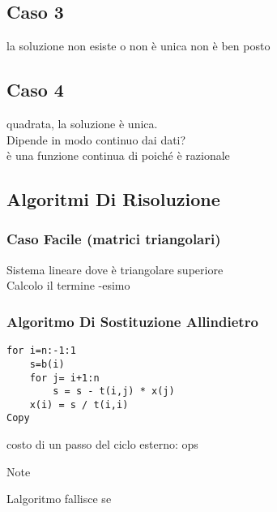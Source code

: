 \documentclass[
]{article}
\begin{document}
\hypertarget{caso-3}{%
\subsection{Caso 3}\label{caso-3}}

{} la soluzione non esiste o non è unica {} non è ben posto

\hypertarget{caso-4}{%
\subsection{Caso 4}\label{caso-4}}

{} quadrata, {} la soluzione è unica.\\
Dipende in modo continuo dai dati?\\
{}{}è una funzione continua di {} poiché è razionale

\hypertarget{algoritmi-di-risoluzione}{%
\subsection{Algoritmi Di Risoluzione}\label{algoritmi-di-risoluzione}}

\hypertarget{caso-facile-matrici-triangolari}{%
\subsubsection{Caso Facile (matrici
triangolari)}\label{caso-facile-matrici-triangolari}}

{}{}Sistema lineare {} dove {} è triangolare superiore\\
{}Calcolo il termine {}-esimo\\
{}{}{}{}

\hypertarget{algoritmo-di-sostituzione-allindietro}{%
\subsubsection{Algoritmo Di Sostituzione
All\textquotesingle indietro}\label{algoritmo-di-sostituzione-allindietro}}

\begin{verbatim}
for i=n:-1:1
    s=b(i)
    for j= i+1:n
        s = s - t(i,j) * x(j)
    x(i) = s / t(i,i)
Copy
\end{verbatim}

costo di un passo del ciclo esterno: {} ops\\
{}

Note

L\textquotesingle algoritmo fallisce se {}
\end{document}
